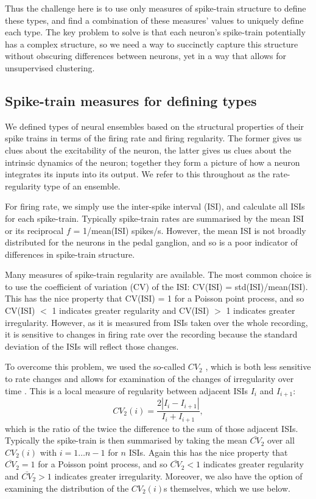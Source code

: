 \documentclass[11pt,a4paper]{article}
\begin{document}
Thus the challenge here is to use only measures of spike-train structure to define these types, and find a combination of these measures' values to uniquely define each type. The key problem to solve is that each neuron's spike-train potentially has a complex structure, so we need a way to succinctly capture this structure without obscuring differences between neurons, yet in a way that allows for unsupervised clustering.


\subsection{Spike-train measures for defining types}
We defined types of neural ensembles based on the structural properties of their spike trains in terms of the firing rate and firing regularity. The former gives us clues about the excitability of the neuron, the latter gives us clues about the intrinsic dynamics of the neuron; together they form a picture of how a neuron integrates its inputs into its output. We refer to this throughout as the rate-regularity type of an ensemble.

For firing rate, we simply use the inter-spike interval (ISI), and calculate all ISIs for each spike-train. Typically spike-train rates are summarised by the mean ISI or its reciprocal $f$ = 1/mean(ISI) spikes/s. However, the mean ISI is not broadly distributed for the neurons in the pedal ganglion, and so is a poor indicator of differences in spike-train structure.

Many measures of spike-train regularity are available. The most common choice is to use the coefficient of variation (CV) of the ISI: CV(ISI) = std(ISI)/mean(ISI). This has the nice property that CV(ISI) = 1 for a Poisson point process, and so CV(ISI) $<$ 1 indicates greater regularity and CV(ISI) $>$ 1 indicates greater irregularity. However, as it is measured from ISIs taken over the whole recording, it is sensitive to changes in firing rate over the recording because the standard deviation of the ISIs will reflect those changes.

To overcome this problem, we used the so-called $CV_2$ \citep{Holt1996}, which is both less sensitive to rate changes and allows for examination of the changes of irregularity over time \citep{Ponce-Alvarez2010,Wohrer2013}. This is a local measure of regularity between adjacent ISIs $I_i$ and $I_{i+1}$:
\begin{equation}
CV_2(i) = \frac{2|I_i - I_{i+1}|}{I_i + I_{i+1}},
\end{equation}
which is the ratio of the twice the difference to the sum of those adjacent ISIs. Typically the spike-train is then summarised by taking the mean $\bar{CV}_2$ over all $CV_2(i)$ with $i=1 \ldots n-1$ for $n$ ISIs. Again this has the nice property that $\bar{CV}_2 = 1$ for a Poisson point process, and so $\bar{CV}_2  < 1$ indicates greater regularity and $\bar{CV}_2 > 1$ indicates greater irregularity. Moreover, we also have the option of examining the distribution of the $CV_2(i)$s themselves, which we use below.
\end{document}
